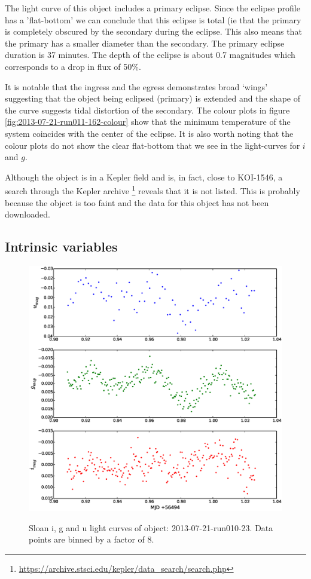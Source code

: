 The light curve of this object includes a primary eclipse. Since the eclipse profile has a 'flat-bottom' we can conclude that this eclipse is total (ie that the primary is completely obscured by the secondary during the eclipse. This also means that the primary has a smaller diameter than the secondary. The primary eclipse duration is 37 minutes. The depth of the eclipse is about 0.7 magnitudes which corresponds to a drop in flux of 50\%. 

It is notable that the ingress and the egress demonstrates broad `wings' suggesting that the object being eclipsed (primary) is extended and the shape of the curve suggests tidal distortion of the secondary. The colour plots in figure \ref{fig:2013-07-21-run011-162-colour} show that the minimum temperature of the system coincides with the center of the eclipse. It is also worth noting that the colour plots do not show the clear flat-bottom that we see in the light-curves for $i$ and $g$. 

Although the object is in a Kepler field and is, in fact, close to KOI-1546, a search through the Kepler archive \footnote{\url{https://archive.stsci.edu/kepler/data_search/search.php}} reveals that it is not listed. This is probably because the object is too faint and the data for this object has not been downloaded. 

\newpage


\subsection{Intrinsic variables}

\begin{figure}
  \center
  \includegraphics[width=120mm]{images/2013-07-21-run010-23_lightcurve-bin8.eps} \\
  \label{fig:2013-07-21-run010-23}
  \caption{Sloan i, g and u light curves of object: 2013-07-21-run010-23. Data points are binned by a factor of 8.}
\end{figure}

